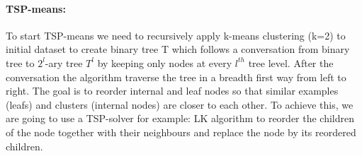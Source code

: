 \paragraph{TSP-means:}
To start TSP-means we need to recursively apply k-means clustering (k=2) to initial dataset to create binary tree T which follows a conversation from binary tree to $2^{l}$-ary tree $T^{l}$ by keeping only nodes at every $l^{th}$ tree level. After the conversation the algorithm traverse the tree in a breadth first way from left to right. The goal is to reorder internal and leaf nodes so that similar examples (leafs) and clusters (internal nodes) are closer to each other. To achieve this, we are going to use a TSP-solver for example: LK algorithm to reorder the children of the node together with their neighbours and replace the node by its reordered children.